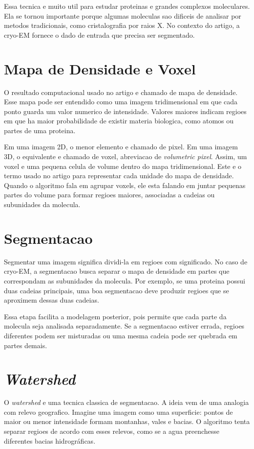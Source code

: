 \documentclass[tcc1]{uftex}
\begin{document}
Essa tecnica e muito util para estudar proteinas e grandes complexos moleculares. Ela se tornou importante porque algumas moleculas sao dificeis de analisar por metodos tradicionais, como cristalografia por raios X. No contexto do artigo, a cryo-EM fornece o dado de entrada que precisa ser segmentado.

\section{Mapa de Densidade e Voxel}

O resultado computacional usado no artigo e chamado de mapa de densidade. Esse mapa pode ser entendido como uma imagem tridimensional em que cada ponto guarda um valor numerico de intensidade. Valores maiores indicam regioes em que ha maior probabilidade de existir materia biologica, como atomos ou partes de uma proteina.

Em uma imagem 2D, o menor elemento e chamado de pixel. Em uma imagem 3D, o equivalente e chamado de voxel, abreviacao de \textit{volumetric pixel}. Assim, um voxel e uma pequena celula de volume dentro do mapa tridimensional. Este e o termo usado no artigo para representar cada unidade do mapa de densidade. Quando o algoritmo fala em agrupar voxels, ele esta falando em juntar pequenas partes do volume para formar regioes maiores, associadas a cadeias ou subunidades da molecula.

\section{Segmentacao}

Segmentar uma imagem significa dividi-la em regioes com significado. No caso de cryo-EM, a segmentacao busca separar o mapa de densidade em partes que correspondam as subunidades da molecula. Por exemplo, se uma proteina possui duas cadeias principais, uma boa segmentacao deve produzir regioes que se aproximem dessas duas cadeias.

Essa etapa facilita a modelagem posterior, pois permite que cada parte da molecula seja analisada separadamente. Se a segmentacao estiver errada, regioes diferentes podem ser misturadas ou uma mesma cadeia pode ser quebrada em partes demais.

\section{\textit{Watershed}}

O \textit{watershed} e uma tecnica classica de segmentacao. A ideia vem de uma analogia com relevo geografico. Imagine uma imagem como uma superficie: pontos de maior ou menor intensidade formam montanhas, vales e bacias. O algoritmo tenta separar regioes de acordo com esses relevos, como se a agua preenchesse diferentes bacias hidrográficas.
\end{document}
